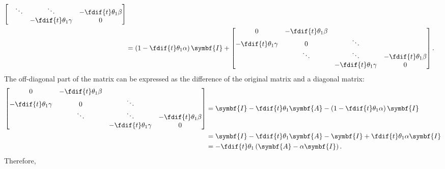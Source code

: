 \documentclass{article}
\begin{document}
\begin{align*}
\begin{bmatrix}
                                  & \ddots                   & \ddots                    & -\fdif{t} \theta_1 \beta \\
                                  &                          & -\fdif{t} \theta_1 \gamma & 0
    \end{bmatrix}
    \\
                                            & = \left( 1 - \fdif{t} \theta_1 \alpha \right) \symbf{I} +
    \begin{bmatrix}
        0                         & -\fdif{t} \theta_1 \beta &                           &                          \\
        -\fdif{t} \theta_1 \gamma & 0                        & \ddots                    &                          \\
                                  & \ddots                   & \ddots                    & -\fdif{t} \theta_1 \beta \\
                                  &                          & -\fdif{t} \theta_1 \gamma & 0
    \end{bmatrix}
    .
\end{align*}
The off-diagonal part of the matrix can be expressed as the difference
of the original matrix and a diagonal matrix:
\begin{align*}
    \begin{bmatrix}
        0                         & -\fdif{t} \theta_1 \beta &                           &                          \\
        -\fdif{t} \theta_1 \gamma & 0                        & \ddots                    &                          \\
                                  & \ddots                   & \ddots                    & -\fdif{t} \theta_1 \beta \\
                                  &                          & -\fdif{t} \theta_1 \gamma & 0
    \end{bmatrix}
     & = \symbf{I} - \fdif{t} \theta_1 \symbf{A} - \left( 1 - \fdif{t} \theta_1 \alpha \right) \symbf{I} \\
     & = \symbf{I} - \fdif{t} \theta_1 \symbf{A} - \symbf{I} + \fdif{t} \theta_1 \alpha \symbf{I}        \\
     & = -\fdif{t} \theta_1 \left( \symbf{A} - \alpha \symbf{I} \right).
\end{align*}
Therefore,
\end{document}

